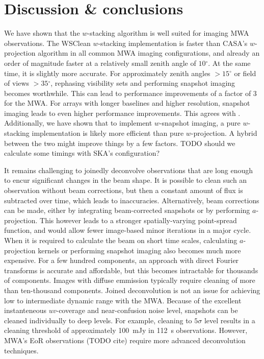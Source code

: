 \documentclass[useAMS,usenatbib]{mn2e}
\newcommand{\degree}{\ensuremath{^{\circ}}\xspace}
\begin{document}
\section{Discussion \& conclusions} \label{sec:discussion}
We have shown that the $w$-stacking algorithm is well suited for imaging MWA observations. The WSClean $w$-stacking implementation is faster than CASA's $w$-projection algorithm in all common MWA imaging configurations, and already an order of magnitude faster at a relatively small zenith angle of $10$\degree. At the same time, it is slightly more accurate. For approximately zenith angles $>15\degree$ or field of views $>35\degree$, rephasing visibility sets and performing snapshot imaging becomes worthwhile. This can lead to performance improvements of a factor of $3$ for the MWA. For arrays with longer baselines and higher resolution, snapshot imaging leads to even higher performance improvements. This agrees with \citet{widefield-imaging-ska-cornwell}. Additionally, we have shown that to implement $w$-snapshot imaging, a pure $w$-stacking implementation is likely more efficient than pure $w$-projection. A hybrid between the two might improve things by a few factors. TODO should we calculate some timings with SKA's configuration?

It remains challenging to joinedly deconvolve observations that are long enough to encur significant changes in the beam shape. It is possible to clean such an observation without beam corrections, but then a constant amount of flux is subtracted over time, which leads to inaccuracies. Alternatively, beam corrections can be made, either by integrating beam-corrected snapshots or by performing $a$-projection. This however leads to a stronger spatially-varying point-spread function, and would allow fewer image-based minor iterations in a major cycle. When it is required to calculate the beam on short time scales, calculating $a$-projection kernels or performing snapshot imaging also becomes much more expensive. For a few hundred components, an approach with direct Fourier transforms is accurate and affordable, but this becomes intractable for thousands of components. Images with diffuse emmission typically require cleaning of more than ten-thousand components. Joined deconvolution is not an issue for achieving low to intermediate dynamic range with the MWA. Because of the excellent instanteneous $uv$-coverage and near-confusion noise level, snapshots can be cleaned individually to deep levels. For example, cleaning to $5\sigma$ level results in a cleaning threshold of approximately 100~mJy in 112~s observations. However, MWA's EoR observations (TODO cite) require more advanced deconvolution techniques.
\end{document}
